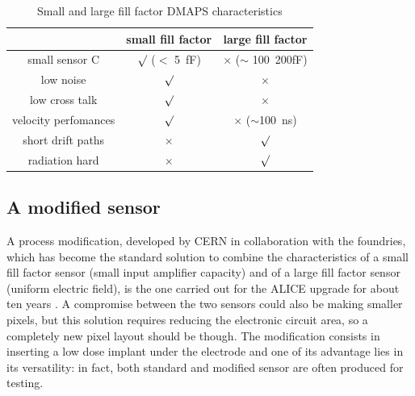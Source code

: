      \begin{table}
         \begin{center}
         \begin{tabular}{|c | c |c |}
         \hline
         & small fill factor & large fill factor\\
         \hline
         \hline
         small sensor C & $\surd$ ($<$ \SI{5}{fF}) & $\times$ ($\sim$ \SI{100}{200}{fF})\\
         low noise & $\surd$ & $\times$\\
         low cross talk & $\surd$ & $\times$ \\
         velocity perfomances & $\surd$ & $\times$ ($\sim$\SI{100}{ns})\\
         short drift paths & $\times$ & $\surd$ \\
         radiation hard & $\times$ & $\surd$ \\
         \hline
         \end{tabular}
         \caption{Small and large fill factor DMAPS characteristics}
         \label{tab:DMAPS_large_small_fillfactor}
         \end{center}
      \end{table}

   \subsection{A modified sensor}\label{chap:a_modified_sensor}
      A process modification, developed by CERN in collaboration with the foundries, which has become the standard solution to combine the characteristics of a small fill factor sensor (small input amplifier capacity) and of a large fill factor sensor (uniform electric field), is the one carried out for the ALICE upgrade for about ten years \cite{AProcessModification}.
      A compromise between the two sensors could also be making smaller pixels, but this solution requires reducing the electronic circuit area, so a completely new pixel layout should be though. The modification consists in inserting a low dose implant under the electrode and one of its advantage lies in its versatility: in fact, both standard and modified sensor are often produced for testing.

